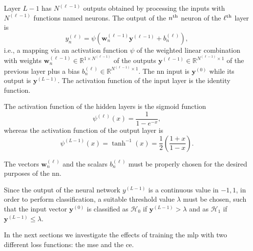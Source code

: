 \documentclass[draftcls,onecolumn,12pt]{IEEEtran}
\begin{document}
Layer $L-1$ has $N^{(\ell-1)}$ outputs obtained by processing the inputs with $N^{(\ell-1)}$ functions named neurons. The output of the $n^{\rm th}$ neuron of the $\ell^{\rm th}$ layer is
\begin{equation}\label{eq:nonLin}
y_n^{(\ell)} = \psi\left( \bm{w}_n^{(\ell -1)}\bm{y}^{(\ell-1)}+b_n^{(\ell)} \right),
\end{equation}
i.e., a mapping via an activation function $\psi$ of the weighted linear combination with weights $\bm{w}_n^{(\ell -1)}\in \mathbb{R}^{1\times N^{(\ell-1)}}$ of the outputs $\bm{y}^{(\ell-1)} \in \mathbb{R}^{N^{(\ell-1)} \times 1 }$ of the previous layer plus a bias $b_n^{(\ell)} \in \mathbb{R}^{N^{(\ell-1)} \times 1 }$. The \ac{nn} input is $\bm{y}^{(0)}$ while its output is $\bm{y}^{(L-1)}$. The activation function of the input layer is the identity function.

The activation function of the hidden layers is the sigmoid function
\begin{equation}
\psi^{(\ell)}(x) = \frac{1}{1-e^{-x}},
\end{equation}
whereas the activation function of the output layer is 
\begin{equation}
\psi^{(L-1)}(x)=\tanh^{-1}(x) = \frac{1}{2} \left( \frac{1+x}{1-x} \right).
\end{equation}


The vectors $\bm{w}_n^{(\ell)}$ and the scalars $b_n^{(\ell)}$ must be properly chosen for the desired purposes of the \ac{nn}.

Since the output of the neural network $y^{(L-1)}$ is a continuous value in ${-1,1}$, in order to perform classification, a suitable threshold value $\lambda$ must be chosen, such that the input vector $\bm{y}^{(0)}$ is classified as
$\mathcal{H}_0$ if $\bm{y}^{(L-1)} > \lambda$ and as $\mathcal{H}_1$ if $\bm{y}^{(L-1)} \le \lambda$.


In the next sections we investigate the effects of training the \ac{mlp} with two different loss functions: the \ac{mse} and the \ac{ce}.
\end{document}
